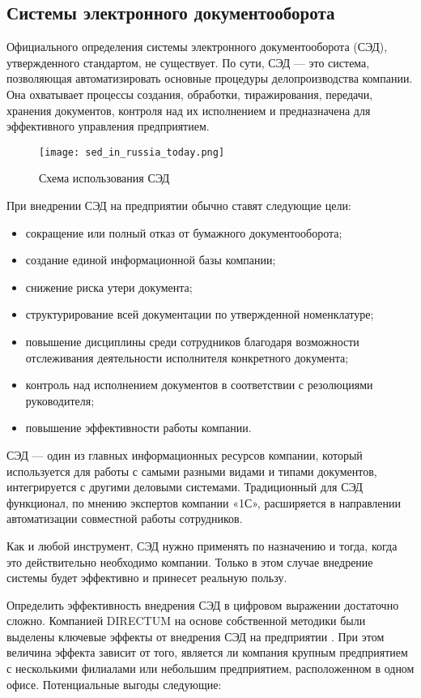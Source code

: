 \subsection{Системы электронного документооборота}
\label{sec:analysis:serv_arch}

Официального определения системы электронного документооборота (СЭД), утвержденного стандартом, не существует. По сути, СЭД — это система, позволяющая автоматизировать основные процедуры делопроизводства компании. Она охватывает процессы создания, обработки, тиражирования, передачи, хранения документов, контроля над их исполнением и предназначена для эффективного управления предприятием.


\begin{figure}[h!]
\centering
	\texttt{[image: sed\_in\_russia\_today.png]}
	\caption{Схема использования СЭД}
\end{figure}
\clearpage


При внедрении СЭД на предприятии обычно ставят следующие цели:
\begin{itemize}
	\item сокращение или полный отказ от бумажного документооборота; 
	\item создание единой информационной базы компании; 
	\item снижение риска утери документа; 
	\item структурирование всей документации по утвержденной номенклатуре;
	\item повышение дисциплины среди сотрудников благодаря возможности отслеживания деятельности исполнителя конкретного документа;
	\item контроль над исполнением документов в соответствии с резолюциями руководителя;
	\item повышение эффективности работы компании.
\end{itemize}

СЭД — один из главных информационных ресурсов компании, который используется для работы с самыми разными видами и типами документов, интегрируется с другими деловыми системами. Традиционный для СЭД функционал, по мнению экспертов компании «1С», расширяется в направлении автоматизации совместной работы сотрудников.

Как и любой инструмент, СЭД нужно применять по назначению и тогда, когда это действительно необходимо компании. Только в этом случае внедрение системы будет эффективно и принесет реальную пользу.

Определить эффективность внедрения СЭД в цифровом выражении достаточно сложно. Компанией DIRECTUM на основе собственной методики были выделены ключевые эффекты от внедрения СЭД на предприятии \cite{directum}. При этом величина эффекта зависит от того, является ли компания крупным предприятием с несколькими филиалами или небольшим предприятием, расположенном в одном офисе. Потенциальные выгоды следующие:


